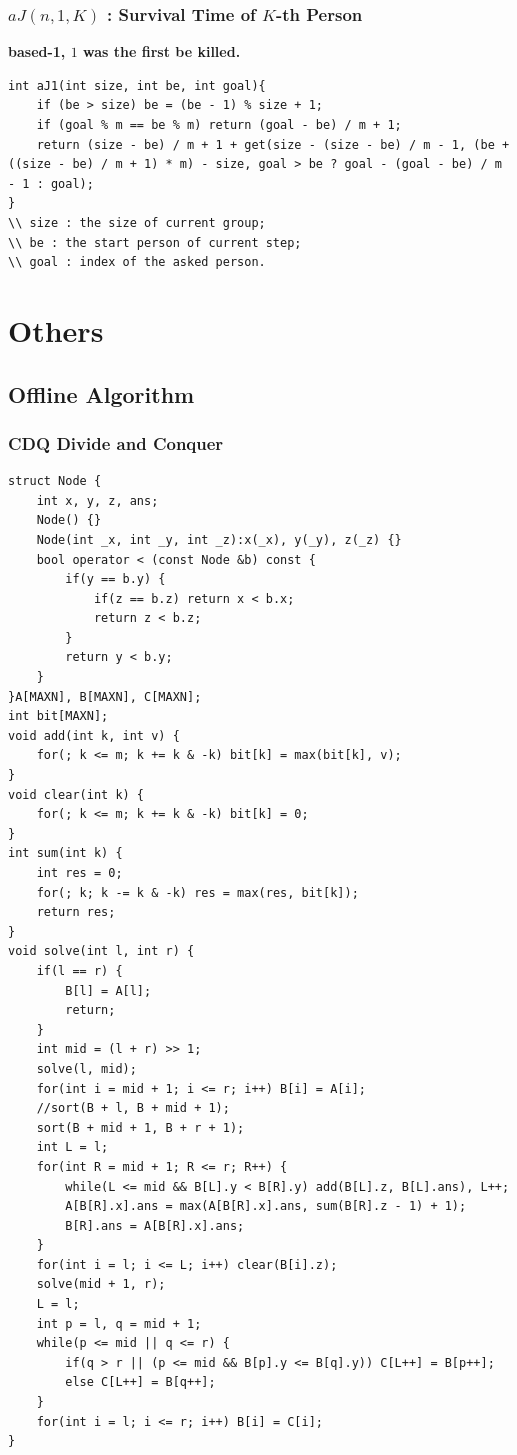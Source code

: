 \documentclass[10pt]{ctexart}
\begin{document}
{{\subsubsection{$aJ(n, 1, K)$ : Survival Time of $K$-th Person}
\textbf{based-1, $1$ was the first be killed.}
\begin{lstlisting}
int aJ1(int size, int be, int goal){
	if (be > size) be = (be - 1) % size + 1;
	if (goal % m == be % m) return (goal - be) / m + 1;
	return (size - be) / m + 1 + get(size - (size - be) / m - 1, (be + ((size - be) / m + 1) * m) - size, goal > be ? goal - (goal - be) / m - 1 : goal);
}
\\ size : the size of current group;
\\ be : the start person of current step;
\\ goal : index of the asked person.
\end{lstlisting}



\newpage
\section{Others}
\subsection{Offline Algorithm}
\subsubsection{CDQ Divide and Conquer}
\begin{lstlisting}
struct Node {
    int x, y, z, ans;
    Node() {}
    Node(int _x, int _y, int _z):x(_x), y(_y), z(_z) {}
    bool operator < (const Node &b) const {
        if(y == b.y) {
            if(z == b.z) return x < b.x;
            return z < b.z;
        }
        return y < b.y;
    }
}A[MAXN], B[MAXN], C[MAXN];
int bit[MAXN];
void add(int k, int v) {
    for(; k <= m; k += k & -k) bit[k] = max(bit[k], v);
}
void clear(int k) {
    for(; k <= m; k += k & -k) bit[k] = 0;
}
int sum(int k) {
    int res = 0;
    for(; k; k -= k & -k) res = max(res, bit[k]);
    return res;
}
void solve(int l, int r) {
    if(l == r) {
        B[l] = A[l];
        return;
    }
    int mid = (l + r) >> 1;
    solve(l, mid);
    for(int i = mid + 1; i <= r; i++) B[i] = A[i];
    //sort(B + l, B + mid + 1);
    sort(B + mid + 1, B + r + 1);
    int L = l;
    for(int R = mid + 1; R <= r; R++) {
        while(L <= mid && B[L].y < B[R].y) add(B[L].z, B[L].ans), L++;
        A[B[R].x].ans = max(A[B[R].x].ans, sum(B[R].z - 1) + 1);
        B[R].ans = A[B[R].x].ans;
    }
    for(int i = l; i <= L; i++) clear(B[i].z);
    solve(mid + 1, r);
    L = l;
    int p = l, q = mid + 1;
    while(p <= mid || q <= r) {
        if(q > r || (p <= mid && B[p].y <= B[q].y)) C[L++] = B[p++];
        else C[L++] = B[q++];
    }
    for(int i = l; i <= r; i++) B[i] = C[i];
}
\end{lstlisting}
}}
\end{document}
